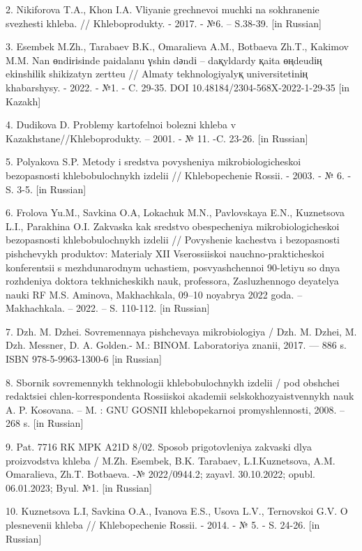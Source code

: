 2. Nikiforova T.A., Khon I.A. Vliyanie grechnevoi muchki na sokhranenie
svezhesti khleba. // Khleboprodukty. - 2017. - №6. -- S.38-39. {[}in
Russian{]}

3. Esembek M.Zh., Tarabaev B.K., Omaralieva A.M., Botbaeva Zh.T.,
Kakimov M.M. Nan өndіrіsіnde paidalanu үshіn dәndі -- daқyldardy қaita
өңdeudің ekіnshіlіk shikіzatyn zertteu // Almaty tekhnologiyalyқ
universitetіnің khabarshysy. - 2022. - №1. - C. 29-35. DOI
10.48184/2304-568X-2022-1-29-35 {[}in Kazakh{]}

4. Dudikova D. Problemy kartofel\textquotesingle noi bolezni khleba v
Kazakhstane//Khleboprodukty. -- 2001. - № 11. -C. 23-26. {[}in
Russian{]}

5. Polyakova S.P. Metody i sredstva povysheniya mikrobiologicheskoi
bezopasnosti khlebobulochnykh izdelii // Khlebopechenie Rossii. - 2003.
- № 6. - S. 3-5. {[}in Russian{]}

6. Frolova Yu.M., Savkina O.A, Lokachuk M.N., Pavlovskaya E.N.,
Kuznetsova L.I., Parakhina O.I. Zakvaska kak sredstvo obespecheniya
mikrobiologicheskoi bezopasnosti khlebobulochnykh izdelii // Povyshenie
kachestva i bezopasnosti pishchevykh produktov: Materialy XII
Vserossiiskoi nauchno-prakticheskoi konferentsii s mezhdunarodnym
uchastiem, posvyashchennoi 90-letiyu so dnya rozhdeniya doktora
tekhnicheskikh nauk, professora, Zasluzhennogo deyatelya nauki RF M.S.
Aminova, Makhachkala, 09--10 noyabrya 2022 goda. -- Makhachkala. --
2022. -- S. 110-112. {[}in Russian{]}

7. Dzh. M. Dzhei. Sovremennaya pishchevaya mikrobiologiya / Dzh. M.
Dzhei, M. Dzh. Messner, D. A. Gol\textquotesingle den.- M.: BINOM.
Laboratoriya znanii, 2017. --- 886 s. ISBN 978-5-9963-1300-6 {[}in
Russian{]}

8. Sbornik sovremennykh tekhnologii khlebobulochnykh izdelii / pod
obshchei redaktsiei chlen-korrespondenta Rossiiskoi akademii
sel\textquotesingle skokhozyaistvennykh nauk A. P. Kosovana. -- M. : GNU
GOSNII khlebopekarnoi promyshlennosti, 2008. -- 268 s. {[}in Russian{]}

9. Pat. 7716 RK MPK A21D 8/02. Sposob prigotovleniya zakvaski dlya
proizvodstva khleba / M.Zh. Esembek, B.K. Tarabaev, L.I.Kuznetsova, A.M.
Omaralieva, Zh.T. Botbaeva. -№ 2022/0944.2; zayavl. 30.10.2022; opubl.
06.01.2023; Byul. №1. {[}in Russian{]}

10. Kuznetsova L.I, Savkina O.A., Ivanova E.S., Usova L.V., Ternovskoi
G.V. O plesnevenii khleba // Khlebopechenie Rossii. - 2014. - № 5. - S.
24-26. {[}in Russian{]}

